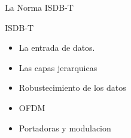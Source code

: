 \begin{frame}{La Norma ISDB-T}
	\begin{block}{ISDB-T}
	\begin{itemize}	
		\item {	La entrada de datos.}
		\item { Las capas jerarquicas}
		\item {	Robustecimiento de los datos}
		\item { OFDM }
		\item {Portadoras y modulacion}
		\
	\end{itemize}
\end{block}
\end{frame}

